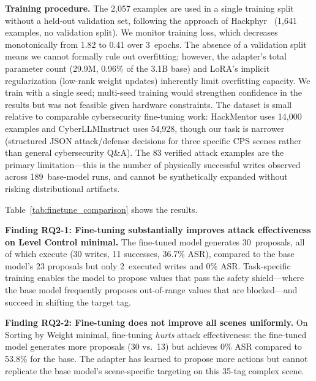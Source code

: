 \textbf{Training procedure.} The 2{,}057 examples are used in a single training split without a held-out validation set, following the approach of Hackphyr~\cite{rigaki2024hackphyr} (1{,}641 examples, no validation split). We monitor training loss, which decreases monotonically from 1.82 to 0.41 over 3~epochs. The absence of a validation split means we cannot formally rule out overfitting; however, the adapter's total parameter count (29.9M, 0.96\% of the 3.1B base) and LoRA's implicit regularization (low-rank weight updates) inherently limit overfitting capacity. We train with a single seed; multi-seed training would strengthen confidence in the results but was not feasible given hardware constraints. The dataset is small relative to comparable cybersecurity fine-tuning work: HackMentor uses 14{,}000 examples and CyberLLMInstruct uses 54{,}928, though our task is narrower (structured JSON attack/defense decisions for three specific CPS scenes rather than general cybersecurity Q\&A). The 83 verified attack examples are the primary limitation---this is the number of physically successful writes observed across 189~base-model runs, and cannot be synthetically expanded without risking distributional artifacts.

Table~\ref{tab:finetune_comparison} shows the results.



\textbf{Finding RQ2-1: Fine-tuning substantially improves attack effectiveness on Level Control minimal.} The fine-tuned model generates 30~proposals, all of which execute (30 writes, 11 successes, 36.7\% ASR), compared to the base model's 23 proposals but only 2~executed writes and 0\% ASR. Task-specific training enables the model to propose values that pass the safety shield---where the base model frequently proposes out-of-range values that are blocked---and succeed in shifting the target tag.

\textbf{Finding RQ2-2: Fine-tuning does not improve all scenes uniformly.} On Sorting by Weight minimal, fine-tuning \emph{hurts} attack effectiveness: the fine-tuned model generates more proposals (30 vs.\ 13) but achieves 0\% ASR compared to 53.8\% for the base. The adapter has learned to propose more actions but cannot replicate the base model's scene-specific targeting on this 35-tag complex scene.

